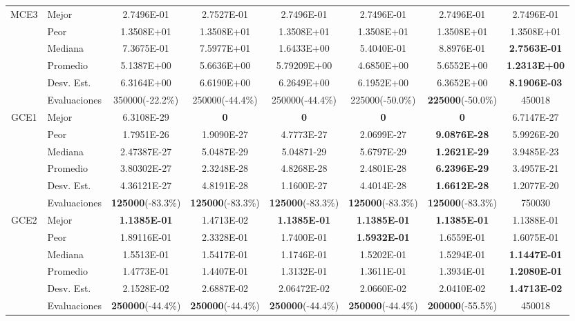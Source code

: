 \begin{table}
{\begin{tabular}{clcccccc}
			\hline
			\multirow{6}{*}{MCE3} & Mejor       & 2.7496E-01    & 2.7527E-01   & 2.7496E-01   &2.7496E-01   & 2.7496E-01    & 2.7496E-01  \\
			& Peor        & 1.3508E+01    & 1.3508E+01   & 1.3508E+01   & 1.3508E+01   & 1.3508E+01   & 1.3508E+01 \\
			& Mediana     & 7.3675E-01   & 7.5977E+01   & 1.6433E+00  & 5.4040E-01   & 8.8976E-01   & \textbf{2.7563E-01}   \\
			& Promedio    & 5.1387E+00   & 5.6636E+00    & 5.79209E+00  & 4.6850E+00   & 5.6552E+00   & \textbf{1.2313E+00} \\
			& Desv. Est.  & 6.3164E+00   & 6.6190E+00    & 6.2649E+00   & 6.1952E+00   & 6.3652E+00   & \textbf{8.1906E-03}  \\
			& Evaluaciones&350000(-22.2\%) &250000(-44.4\%) &250000(-44.4\%)   & 225000(-50.0\%)   & \textbf{225000}(-50.0\%)  & 450018 \\
			
			
			\hline
			\multirow{6}{*}{GCE1} & Mejor       & 6.3108E-29    &\textbf{ 0 }          &\textbf{ 0   }         &\textbf{ 0}            &\textbf{ 0 }           &6.7147E-27 \\
			& Peor        &1.7951E-26    & 1.9090E-27   & 4.7773E-27   & 2.0699E-27   & \textbf{9.0876E-28}  & 5.9926E-20 \\
			& Mediana     &2.47387E-27  & 5.0487E-29   & 5.04871-29   & 5.6797E-29   & \textbf{1.2621E-29}   & 3.9485E-23  \\
			& Promedio    &3.80302E-27   &2.3248E-28    & 4.8268E-28  & 2.4801E-28   &\textbf{ 6.2396E-29 } & 3.4957E-21  \\
			& Desv. Est.  & 4.36121E-27    &4.8191E-28   &	1.1600E-27  & 4.4014E-28   &\textbf{ 1.6612E-28}   & 1.2077E-20  \\
			& Evaluaciones&\textbf{125000}(-83.3\%) &\textbf{125000}(-83.3\%) &\textbf{125000}(-83.3\%)    & \textbf{125000}(-83.3\%)    & \textbf{125000}(-83.3\%)  & 750030\\
			
			
			\hline
			\multirow{6}{*}{GCE2} & Mejor       &\textbf{1.1385E-01}&1.4713E-02&\textbf{	1.1385E-01	}&\textbf{1.1385E-01}&	\textbf{1.1385E-01 }        &1.1388E-01 \\
			& Peor        &1.89116E-01&	2.3328E-01&	1.7400E-01&	\textbf{1.5932E-01}&	1.6559E-01    &1.6075E-01 \\
			& Mediana     &1.5513E-01&	1.5417E-01&	1.1746E-01&	1.5202E-01&	1.5294E-01 & \textbf{1.1447E-01}  \\
			& Promedio    & 1.4773E-01&	1.4407E-01&	1.3132E-01&	1.3611E-01&	1.3934E-01 &\textbf{ 1.2080E-01 } \\
			& Desv. Est.  &2.1528E-02&	2.6887E-02	&2.06472E-02	&2.0660E-02	&2.0410E-02& \textbf{1.4713E-02 }\\
			& Evaluaciones &\textbf{250000}(-44.4\%) &\textbf{250000}(-44.4\%) &\textbf{250000}(-44.4\%)  & \textbf{250000}(-44.4\%)  &\textbf{200000}(-55.5\%)  &  450018 \\
			

\end{tabular}}
\end{table}
